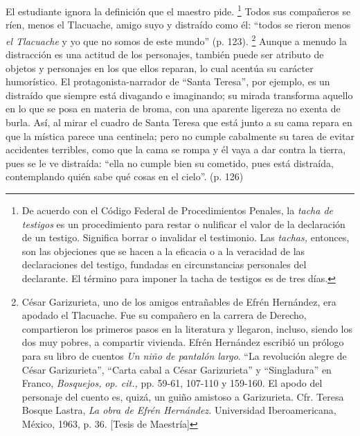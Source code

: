 \documentclass[14pt,twoside,final]{extbook} %
\let\oldfootnote\footnote
\renewcommand\footnote[1]{%
\oldfootnote{\hspace{1mm}#1}}
\begin{document}
El estudiante ignora la definición que el maestro pide.\footnote{De acuerdo con el Código Federal de Procedimientos Penales, la \emph{tacha de testigos} es un procedimiento para restar o nulificar el valor de la declaración de un testigo. Significa borrar o invalidar el testimonio. Las \emph{tachas,} entonces, son las objeciones que se hacen a la eficacia o a la veracidad de las declaraciones del testigo, fundadas en circunstancias personales del declarante. El término para imponer la tacha de testigos es de tres días.} Todos sus compañeros se ríen, menos el Tlacuache, amigo suyo y distraído como él: ``todos se rieron menos \emph{el Tlacuache} y yo que no somos de este mundo'' (p. 123).\footnote{César Garizurieta, uno de los amigos entrañables de Efrén Hernández, era apodado el Tlacuache. Fue su compañero en la carrera de Derecho, compartieron los primeros pasos en la literatura y llegaron, incluso, siendo los dos muy pobres, a compartir vivienda. Efrén Hernández escribió un prólogo para su libro de cuentos \emph{Un niño de pantalón largo}. ``La revolución alegre de César Garizurieta'', ``Carta cabal a César Garizurieta'' y ``Singladura'' en Franco, \emph{Bosquejos,} \emph{op. cit.,} pp. 59-61, 107-110 y 159-160. El apodo del personaje del cuento es, quizá, un guiño amistoso a Garizurieta.  Cfr. Teresa Bosque Lastra, \emph{La obra de Efrén Hernández.} Universidad Iberoamericana, México, 1963, p. 36. [Tesis de Maestría]} Aunque a menudo la distracción es una actitud de los personajes, también puede ser atributo de objetos y personajes en los que ellos reparan, lo cual acentúa su carácter humorístico. El protagonista-narrador de ``Santa Teresa'', por ejemplo, es un distraído que siempre está divagando e imaginando; su mirada transforma aquello en lo que se posa en materia de broma, con una aparente ligereza no exenta de burla. Así, al mirar el cuadro de Santa Teresa que está junto a su cama repara en que la mística parece una centinela; pero no cumple cabalmente su tarea de evitar accidentes terribles, como que la cama se rompa y él vaya a dar contra la tierra, pues se le ve distraída: ``ella no cumple bien su cometido, pues está distraída, contemplando quién sabe qué cosas en el cielo''. (p. 126)
\end{document}
